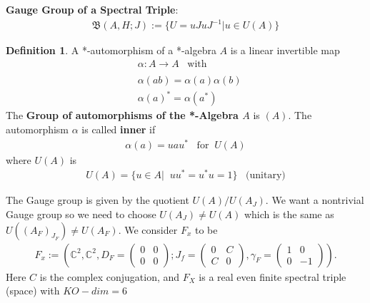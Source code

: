 \documentclass[a4paper]{article}
\theoremstyle{definition}
\newtheorem{definition}{Definition}
\theoremstyle{definition}
\theoremstyle{definition}
\theoremstyle{theorem}
\theoremstyle{theorem}
\theoremstyle{theorem}
\begin{document}
    \textbf{Gauge Group of a Spectral Triple}:
    \begin{align}
        \mathfrak{B}(A, H; J) := \{ U = uJuJ^{-1} | u\in U(A)\}
    \end{align}
    \begin{definition}
        A *-automorphism of a *-algebra $A$ is a linear invertible
        map
        \begin{align}
            &\alpha:A \rightarrow A\;\;\; \text{with}\\
            \nonumber\\
            &\alpha(ab) = \alpha(a)\alpha(b)\\
            &\alpha(a)^* = \alpha(a^*)
        \end{align}
        The \textbf{Group of automorphisms of the *-Algebra $A$} is
        $(A)$.\newline
        The automorphism $\alpha$ is called \textbf{inner} if
        \begin{align}
            \alpha(a) = u a u^* \;\;\; \text{for} \;\; U(A)
        \end{align}
        where $U(A)$ is
        \begin{align}
            U(A) = \{ u\in A|\;\; uu^* = u^*u=1\} \;\;\;
            \text{(unitary)}
        \end{align}
    \end{definition}
    The Gauge group is given by the quotient $U(A)/U(A_J)$.
    We want a nontrivial Gauge group so we need to choose $U(A_J) \neq
    U(A)$ which is the same as $U((A_F)_{J_F}) \neq
    U(A_F)$.
    We consider $F_x$ to be
    \begin{align}
        F_x := \left(\mathbb{C}^2,\mathbb{C}^2, D_F =\begin{pmatrix}
            0&0\\0&0\end{pmatrix}; J_f =\begin{pmatrix}
        0&C\\C&0\end{pmatrix},
                \gamma_F = \begin{pmatrix}1&0\\0&-1\end{pmatrix}\right).
    \end{align}
    Here $C$ is the complex conjugation, and $F_X$ is a real even finite
        spectral triple (space) with $KO-dim=6$
\end{document}
